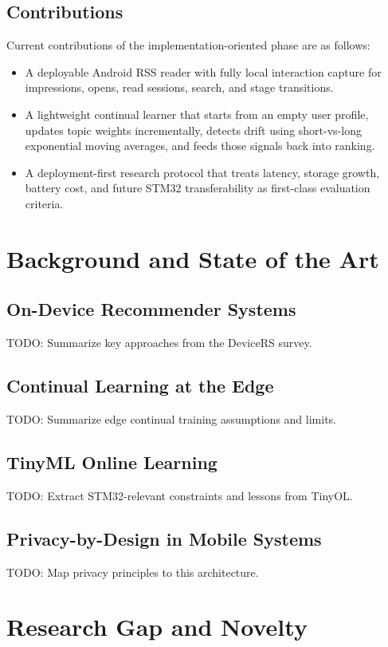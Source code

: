 \documentclass[11pt]{article}
\begin{document}
\subsection{Contributions}
Current contributions of the implementation-oriented phase are as follows:

\begin{itemize}[leftmargin=*]
\item A deployable Android RSS reader with fully local interaction capture for impressions, opens, read sessions, search, and stage transitions.
\item A lightweight continual learner that starts from an empty user profile, updates topic weights incrementally, detects drift using short-vs-long exponential moving averages, and feeds those signals back into ranking.
\item A deployment-first research protocol that treats latency, storage growth, battery cost, and future STM32 transferability as first-class evaluation criteria.
\end{itemize}

\section{Background and State of the Art}
\subsection{On-Device Recommender Systems}
TODO: Summarize key approaches from the DeviceRS survey.

\subsection{Continual Learning at the Edge}
TODO: Summarize edge continual training assumptions and limits.

\subsection{TinyML Online Learning}
TODO: Extract STM32-relevant constraints and lessons from TinyOL.

\subsection{Privacy-by-Design in Mobile Systems}
TODO: Map privacy principles to this architecture.

\section{Research Gap and Novelty}
\end{document}
